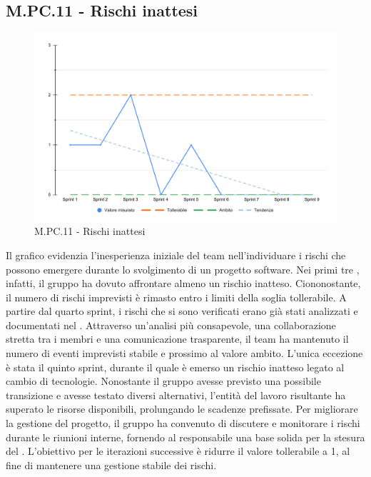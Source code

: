 \subsection{M.PC.11 - Rischi inattesi}
\begin{figure}[H]
    \centering
    \includegraphics[width=\textwidth]{assets/rischi_inattesi.pdf}
    \caption{M.PC.11 - Rischi inattesi}
\end{figure}

\par Il grafico evidenzia l’inesperienza iniziale del team nell’individuare i rischi che possono emergere durante lo svolgimento di un progetto software. Nei primi tre , infatti, il gruppo ha dovuto affrontare almeno un rischio inatteso. Ciononostante, il numero di rischi imprevisti è rimasto entro i limiti della soglia tollerabile. A partire dal quarto sprint, i rischi che si sono verificati erano già stati analizzati e documentati nel \PdP. Attraverso un’analisi più consapevole, una collaborazione stretta tra i membri e una comunicazione trasparente, il team ha mantenuto il numero di eventi imprevisti stabile e prossimo al valore ambito. L'unica eccezione è stata il quinto sprint, durante il quale è emerso un rischio inatteso legato al cambio di tecnologie. Nonostante il gruppo avesse previsto una possibile transizione e avesse testato diversi  alternativi, l’entità del lavoro risultante ha superato le risorse disponibili, prolungando le scadenze prefissate. Per migliorare la gestione del progetto, il gruppo ha convenuto di discutere e monitorare i rischi durante le riunioni interne, fornendo al responsabile una base solida per la stesura del \PdP. L'obiettivo per le iterazioni successive è ridurre il valore tollerabile a 1, al fine di mantenere una gestione stabile dei rischi.
